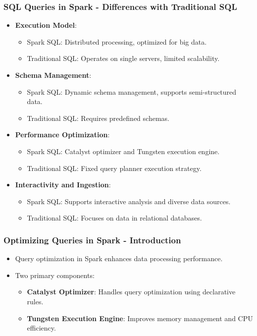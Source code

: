 \documentclass[aspectratio=169]{beamer}
\begin{document}
\begin{frame}[fragile]
    \frametitle{SQL Queries in Spark - Differences with Traditional SQL}
    \begin{itemize}
        \item \textbf{Execution Model}:
        \begin{itemize}
            \item Spark SQL: Distributed processing, optimized for big data.
            \item Traditional SQL: Operates on single servers, limited scalability.
        \end{itemize}
        
        \item \textbf{Schema Management}:
        \begin{itemize}
            \item Spark SQL: Dynamic schema management, supports semi-structured data.
            \item Traditional SQL: Requires predefined schemas.
        \end{itemize}

        \item \textbf{Performance Optimization}:
        \begin{itemize}
            \item Spark SQL: Catalyst optimizer and Tungsten execution engine.
            \item Traditional SQL: Fixed query planner execution strategy.
        \end{itemize}
        
        \item \textbf{Interactivity and Ingestion}:
        \begin{itemize}
            \item Spark SQL: Supports interactive analysis and diverse data sources.
            \item Traditional SQL: Focuses on data in relational databases.
        \end{itemize}
    \end{itemize}
\end{frame}

\begin{frame}[fragile]
    \frametitle{Optimizing Queries in Spark - Introduction}
    \begin{itemize}
        \item Query optimization in Spark enhances data processing performance.
        \item Two primary components:
        \begin{itemize}
            \item \textbf{Catalyst Optimizer}: Handles query optimization using declarative rules.
            \item \textbf{Tungsten Execution Engine}: Improves memory management and CPU efficiency.
        \end{itemize}
    \end{itemize}
\end{frame}
\end{document}
